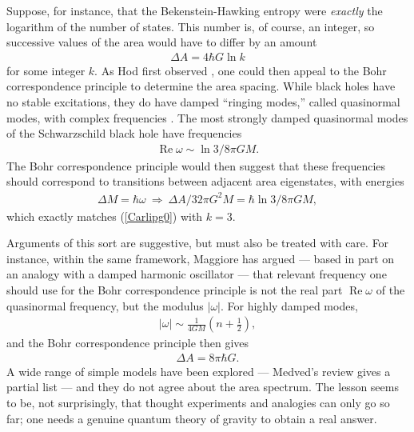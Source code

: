\documentclass[11pt]{article}
\begin{document}
Suppose, for instance, that the Bekenstein-Hawking entropy were 
\emph{exactly} the logarithm of the number of states.  This number
is, of course, an integer, so successive values of the area would have to 
differ by an amount
\begin{align}
\Delta A = 4\hbar G\ln k
\label{Carlipg0}
\end{align}
for some integer $k$.  As Hod first observed \cite{Hod}, one could then
appeal to the Bohr correspondence principle to determine the area
spacing.  While black holes have no stable excitations, they do have 
damped ``ringing modes,'' called quasinormal modes, with complex 
frequencies \cite{Siopsis}.  The most strongly damped quasinormal 
modes of the Schwarzschild black hole have frequencies
\begin{align}
\mathop{Re}\omega \sim \ln 3/8\pi GM   .
\label{Carlipg01}
\end{align}
The Bohr correspondence principle would then suggest that these
frequencies should correspond to transitions between adjacent area 
eigenstates,
with energies
\begin{align}
\Delta M =  \hbar\omega \ \Rightarrow \
\Delta A/32\pi G^2 M = \hbar\ln 3/8\pi GM  ,
\label{Carlipg02}
\end{align}
which exactly matches (\ref{Carlipg0}) with $k=3$.

Arguments of this sort are suggestive, but must also be treated with
care.  For instance, within the same framework, Maggiore \cite{Magg}
has argued --- based in part on an analogy with a damped harmonic
oscillator --- that relevant frequency one should use for the Bohr
correspondence principle is not the real part $\mathop{Re}\omega$
of the quasinormal frequency, but the modulus $|\omega|$.  For
highly damped modes,
\begin{align}
|\omega| \sim  \frac{1}{4GM} \left(n+\frac{1}{2}\right)   ,
\label{Carlipg03}
\end{align}
and the Bohr correspondence principle then gives
\begin{align}
\Delta A = 8\pi\hbar G   .
\label{Carlipg04}
\end{align}
A wide range of simple models have been explored --- Medved's
review \cite{Medved} gives a partial list --- and they do not agree
about the area spectrum.  The lesson seems to be, not surprisingly, 
that thought experiments and analogies can only go so far; one needs
 a genuine quantum theory of gravity to obtain a real answer.
\end{document}
